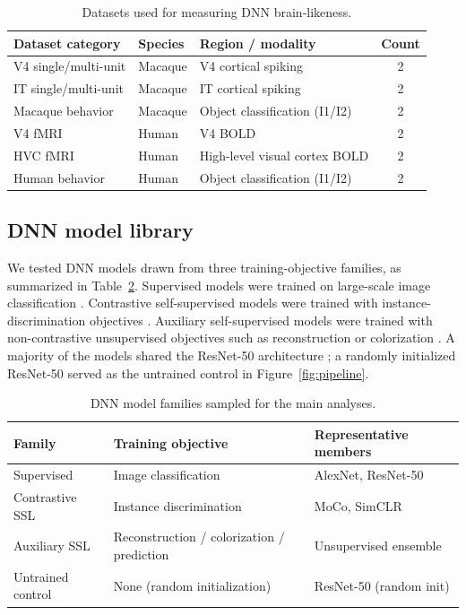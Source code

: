 \documentclass[11pt]{article}
\begin{document}
\begin{table}[htbp]
\centering
\caption{Datasets used for measuring DNN brain-likeness.}
\label{tab:datasets}
\begin{tabular}{lllc}
\toprule
Dataset category & Species & Region / modality & Count \\
\midrule
V4 single/multi-unit & Macaque & V4 cortical spiking & 2 \\
IT single/multi-unit & Macaque & IT cortical spiking & 2 \\
Macaque behavior & Macaque & Object classification (I1/I2) & 2 \\
V4 fMRI & Human & V4 BOLD & 2 \\
HVC fMRI & Human & High-level visual cortex BOLD & 2 \\
Human behavior & Human & Object classification (I1/I2) & 2 \\
\bottomrule
\end{tabular}
\end{table}

\subsection{DNN model library}

We tested DNN models drawn from three training-objective families, as
summarized in Table~\ref{tab:dnns}. Supervised models were trained on
large-scale image classification \citep{krizhevsky2012imagenet, he2016deep}.
Contrastive self-supervised models were trained with instance-discrimination
objectives \citep{chen2020simple, he2020momentum}. Auxiliary self-supervised
models were trained with non-contrastive unsupervised objectives such as
reconstruction or colorization \citep{zhuang2021unsupervised}. A majority of
the models shared the ResNet-50 architecture \citep{he2016deep}; a randomly
initialized ResNet-50 served as the untrained control in
Figure~\ref{fig:pipeline}.

\begin{table}[htbp]
\centering
\caption{DNN model families sampled for the main analyses.}
\label{tab:dnns}
\begin{tabular}{lll}
\toprule
Family & Training objective & Representative members \\
\midrule
Supervised & Image classification & AlexNet, ResNet-50 \\
Contrastive SSL & Instance discrimination & MoCo, SimCLR \\
Auxiliary SSL & Reconstruction / colorization / prediction & Unsupervised ensemble \\
Untrained control & None (random initialization) & ResNet-50 (random init) \\
\bottomrule
\end{tabular}
\end{table}
\end{document}
